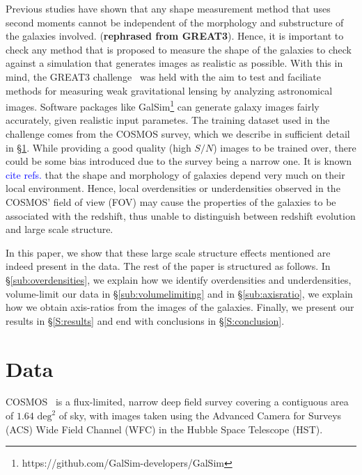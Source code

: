 \documentclass[twocolumn,useAMS,usenatbib]{mn2e}
\newcommand{\arun}[1]{{\textcolor{blue}{#1}}}
\begin{document}
Previous studies have shown that any shape measurement method that uses second moments cannot be independent of the morphology and substructure of the galaxies involved. ({\bf rephrased from GREAT3}).
Hence, it is important to check any method that is proposed to measure the shape of the galaxies to check against a simulation that generates images as realistic as possible.  
With this in mind, the GREAT3 challenge~\citep{great3} was held with the aim to test and faciliate methods for measuring weak gravitational lensing by analyzing astronomical images.
Software packages like GalSim\footnote{https://github.com/GalSim-developers/GalSim} can generate galaxy images fairly accurately, given realistic input parametes.
The training dataset used in the challenge comes from the COSMOS survey, which we describe in sufficient detail in \S\ref{S:data}.
While providing a good quality (high $S/N$) images to be trained over, there could be some bias introduced due to the survey being a narrow one.
It is known \arun{cite refs.} that the shape and morphology of galaxies depend very much on their local environment. Hence, local overdensities or underdensities
observed in the COSMOS' field of view (FOV) may cause the properties of the galaxies to be associated with the redshift, thus unable to distinguish between redshift evolution and large scale structure.

In this paper, we show that these large scale structure effects mentioned are indeed present in the data. The rest of the paper is structured as follows.
In \S\ref{sub:overdensities}, we explain how we identify overdensities and underdensities, volume-limit our data in \S\ref{sub:volumelimiting} and in \S\ref{sub:axisratio},
 we explain how we obtain axis-ratios from the images of the galaxies. Finally, we present our results in \S\ref{S:results} and end with conclusions in \S\ref{S:conclusion}.
\section{Data}
\label{S:data}
COSMOS~\citep{COSMOS_overview, COSMOS_generic, COSMOS_Alexie} is a flux-limited, narrow deep field survey covering a contiguous area of $1.64 \text{ deg}^2$ of sky, with images taken using the Advanced Camera for Surveys (ACS) Wide Field Channel (WFC)
in the Hubble Space Telescope (HST). 
\end{document}
